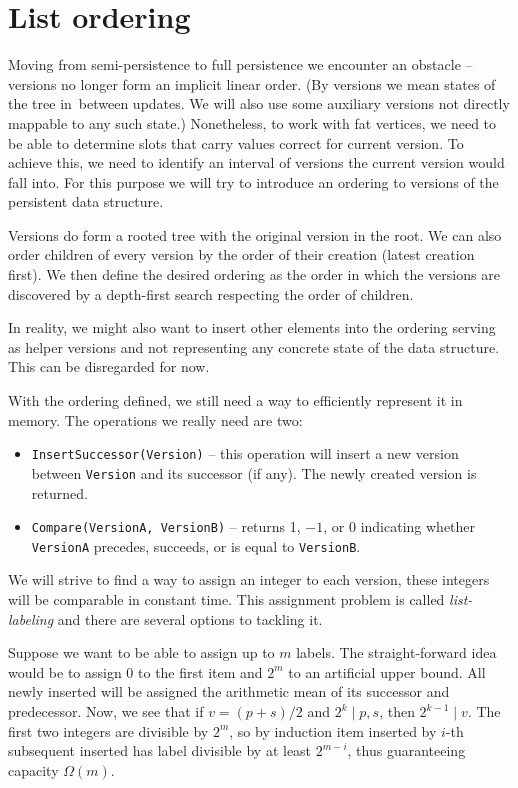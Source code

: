 \section{List ordering}

Moving from semi-persistence to full persistence we encounter an obstacle -- versions no longer form an implicit linear order. (By versions we mean states of the tree in~between updates. We will also use some auxiliary versions not directly mappable to any such state.) Nonetheless, to work with fat vertices, we need to be able to determine slots that carry values correct for current version. To achieve this, we need to identify an interval of versions the current version would fall into. For this purpose we will try to introduce an ordering to versions of the persistent data structure.

Versions do form a rooted tree with the original version in the root. We can also order children of every version by the order of their creation (latest creation first). We then define the desired ordering as the order in which the versions are discovered by a depth-first search respecting the order of children. %

In reality, we might also want to insert other elements into the ordering serving as helper versions and not representing any concrete state of the data structure. This can be disregarded for now.

With the ordering defined, we still need a way to efficiently represent it in memory. The operations we really need are two:

\begin{itemize}
	\item \texttt{InsertSuccessor(Version)} -- this operation will insert a new version between \texttt{Version} and its successor (if any). The newly created version is returned.
	\item \texttt{Compare(VersionA, VersionB)} -- returns 1, $-1$, or 0 indicating whether \texttt{VersionA} precedes, succeeds, or is equal to \texttt{VersionB}.
\end{itemize}

We will strive to find a way to assign an integer to each version, these integers will be comparable in constant time. This assignment problem is called \emph{list-labeling} and there are several options to tackling it.

Suppose we want to be able to assign up to $m$ labels. The straight-forward idea would be to assign 0 to the first item and $2^m$ to an artificial upper bound. All newly inserted will be assigned the arithmetic mean of its successor and predecessor. Now, we see that if $v = (p + s)/2$ and $ 2^k \mid p, s$, then $2^{k-1} \mid v$. The first two integers are divisible by $2^m$, so by induction item inserted by $i$-th subsequent inserted has label divisible by at least $2^{m-i}$, thus guaranteeing capacity $\Omega(m)$. 

